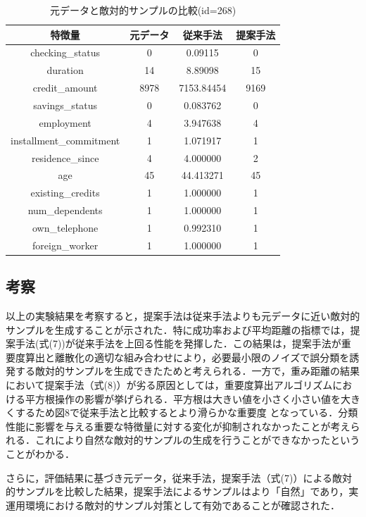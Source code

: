 \begin{table}[H]
    \centering
    \caption{元データと敵対的サンプルの比較(id=268)}
    \begin{tabular}{|c|c|c|c|} \hline
        特徴量 & 元データ & 従来手法 & 提案手法 \\ \hline
        checking\_status & 0 & 0.09115 & 0\\ \hline
        duration & 14 & 8.89098 & 15 \\ \hline
        credit\_amount & 8978 & 7153.84454 & 9169 \\ \hline
        savings\_status & 0 & 0.083762 & 0\\ \hline
        employment & 4 & 3.947638  & 4 \\ \hline
        installment\_commitment & 1 & 1.071917 & 1\\ \hline
        residence\_since & 4 & 4.000000 & 2 \\ \hline
        age & 45 & 44.413271 & 45 \\ \hline
        existing\_credits & 1 & 1.000000 & 1 \\ \hline
        num\_dependents & 1 & 1.000000 & 1 \\ \hline
        own\_telephone & 1 & 0.992310 & 1 \\ \hline
        foreign\_worker & 1 & 1.000000 & 1 \\ \hline
    \end{tabular}
\end{table}


\subsection{考察}
以上の実験結果を考察すると，提案手法は従来手法よりも元データに近い敵対的サンプルを生成することが示された．特に成功率および平均距離の指標では，提案手法(式(7))が従来手法を上回る性能を発揮した．この結果は，提案手法が重要度算出と離散化の適切な組み合わせにより，必要最小限のノイズで誤分類を誘発する敵対的サンプルを生成できたためと考えられる．一方で，重み距離の結果において提案手法（式(8)）が劣る原因としては，重要度算出アルゴリズムにおける平方根操作の影響が挙げられる．平方根は大きい値を小さく小さい値を大きくするため図8で従来手法と比較するとより滑らかな重要度
となっている．分類性能に影響を与える重要な特徴量に対する変化が抑制されなかったことが考えられる．これにより自然な敵対的サンプルの生成を行うことができなかったということがわかる．

さらに，評価結果に基づき元データ，従来手法，提案手法（式(7)）による敵対的サンプルを比較した結果，提案手法によるサンプルはより「自然」であり，実運用環境における敵対的サンプル対策として有効であることが確認された．

